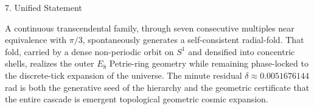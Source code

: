 7. Unified Statement

A continuous transcendental family, through seven consecutive multiples near equivalence with \(\pi/3\), spontaneously generates a self-consistent radial-fold. That fold, carried by a dense non-periodic orbit on \(S^1\) and densified into concentric shells, realizes the outer \(E_8\) Petrie-ring geometry while remaining phase-locked to the discrete-tick expansion of the universe. The minute residual \(\delta\approx0.0051676144\) rad is both the generative seed of the hierarchy and the geometric certificate that the entire cascade is emergent topological geometric cosmic expansion.
